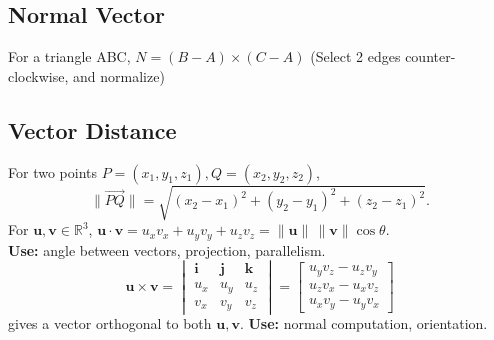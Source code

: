 \documentclass[10pt,twocolumn]{extarticle}
\begin{document}
\subsection*{Normal Vector}
For a triangle ABC, $N = (B - A) \times (C - A)$ (Select 2 edges counter-clockwise, and normalize)
\subsection*{Vector Distance}
For two points $P=(x_1,y_1,z_1), Q=(x_2,y_2,z_2)$,
\[
\|\overrightarrow{PQ}\| = \sqrt{(x_2-x_1)^2+(y_2-y_1)^2+(z_2-z_1)^2}.
\]
For $\mathbf{u}, \mathbf{v} \in \mathbb{R}^3$,
$
\mathbf{u} \cdot \mathbf{v} = u_x v_x + u_y v_y + u_z v_z
= \|\mathbf{u}\|\,\|\mathbf{v}\|\cos\theta.
$\\
\textbf{Use:} angle between vectors, projection, parallelism.
\[
\mathbf{u} \times \mathbf{v} =
\begin{vmatrix}
\mathbf{i} & \mathbf{j} & \mathbf{k} \\
u_x & u_y & u_z \\
v_x & v_y & v_z
\end{vmatrix} = \begin{bmatrix}u_y v_z - u_z v_y\\ u_z v_x - u_x v_z \\ u_x v_y - u_y v_x\end{bmatrix}\]
gives a vector orthogonal to both $\mathbf{u}, \mathbf{v}$.  
\textbf{Use:} normal computation, orientation.
\end{document}
